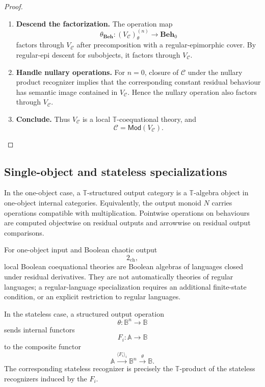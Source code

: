 \begin{proof}
\begin{enumerate}
        \item \textbf{Descend the factorization.}
        The operation map
        \[
            \theta_{\mathbf{Beh}}:
            (V_{\mathcal C})^{(n)}_\theta\to\mathbf{Beh}_0
        \]
        factors through \(V_{\mathcal C}\) after precomposition with a
        regular-epimorphic cover. By regular-epi descent for subobjects, it
        factors through \(V_{\mathcal C}\).

        \item \textbf{Handle nullary operations.}
        For \(n=0\), closure of \(\mathcal C\) under the nullary product
        recognizer implies that the corresponding constant residual behaviour
        has semantic image contained in \(V_{\mathcal C}\). Hence the nullary
        operation also factors through \(V_{\mathcal C}\).

        \item \textbf{Conclude.}
        Thus \(V_{\mathcal C}\) is a local \(\mathbb T\)-coequational theory,
        and
        \[
            \mathcal C=\mathsf{Mod}(V_{\mathcal C}).
        \]
    \end{enumerate}
\end{proof}

\subsection{Single-object and stateless specializations}
\label{subsec:structured-single-object-stateless}

In the one-object case, a \(\mathbb T\)-structured output category is a
\(\mathbb T\)-algebra object in one-object internal categories. Equivalently,
the output monoid \(N\) carries operations compatible with multiplication.
Pointwise operations on behaviours are computed objectwise on residual outputs
and arrowwise on residual output comparisons.

For one-object input and Boolean chaotic output
\[
    2_{\mathrm{ch}},
\]
local Boolean coequational theories are Boolean algebras of languages closed
under residual derivatives. They are not automatically theories of regular
languages; a regular-language specialization requires an additional
finite-state condition, or an explicit restriction to regular languages.

In the stateless case, a structured output operation
\[
    \theta:\mathbb B^n\to\mathbb B
\]
sends internal functors
\[
    F_i:\mathbb A\to\mathbb B
\]
to the composite functor
\[
    \mathbb A
    \xrightarrow{\langle F_i\rangle_i}
    \mathbb B^n
    \xrightarrow{\theta}
    \mathbb B.
\]
The corresponding stateless recognizer is precisely the
\(\mathbb T\)-product of the stateless recognizers induced by the \(F_i\).

